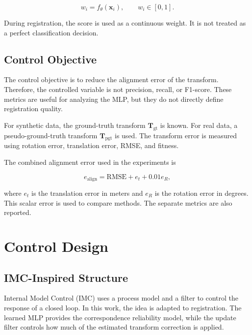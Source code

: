 \documentclass[conference]{IEEEtran}
\newcommand{\T}{\bm{T}}
\newcommand{\w}{w}
\newcommand{\x}{\bm{x}}
\newcommand{\Tgt}{\T_{\mathrm{gt}}}
\newcommand{\Tpgt}{\T_{\mathrm{pgt}}}
\begin{document}
\begin{equation}
    \w_i = f_{\theta}(\x_i),
    \qquad
    \w_i \in [0,1].
    \label{eq:mlp_weight}
\end{equation}

During registration, the score is used as a continuous weight. It is not treated as a perfect classification decision.

\subsection{Control Objective}
\label{subsec:control_objective}

The control objective is to reduce the alignment error of the transform. Therefore, the controlled variable is not precision, recall, or F1-score. These metrics are useful for analyzing the MLP, but they do not directly define registration quality.

For synthetic data, the ground-truth transform $\Tgt$ is known. For real data, a pseudo-ground-truth transform $\Tpgt$ is used. The transform error is measured using rotation error, translation error, RMSE, and fitness.

The combined alignment error used in the experiments is

\begin{equation}
    e_{\mathrm{align}}
    =
    \mathrm{RMSE}
    +
    e_t
    +
    0.01 e_R,
    \label{eq:alignment_error}
\end{equation}

where $e_t$ is the translation error in meters and $e_R$ is the rotation error in degrees. This scalar error is used to compare methods. The separate metrics are also reported.

\section{Control Design}
\label{sec:control_design}

\subsection{IMC-Inspired Structure}
\label{subsec:imc_structure}

Internal Model Control (IMC) uses a process model and a filter to control the response of a closed loop. In this work, the idea is adapted to registration. The learned MLP provides the correspondence reliability model, while the update filter controls how much of the estimated transform correction is applied.
\end{document}

